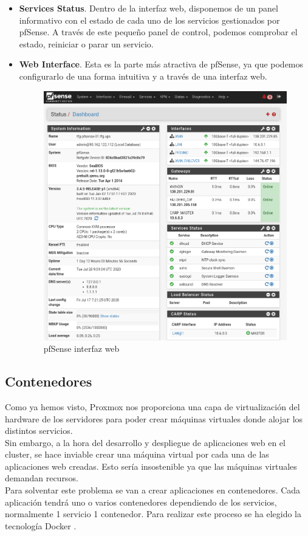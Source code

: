 \begin{paragraph}
\begin{itemize}
					\item \textbf{Services Status}. Dentro de la interfaz web, disponemos de un panel informativo con el estado de cada uno de los servicios gestionados por pfSense. A través de este pequeño panel de control, podemos comprobar el estado, reiniciar o parar un servicio.
					\item \textbf{Web Interface}. Esta es la parte más atractiva de pfSense, ya que podemos configurarlo de una forma intuitiva y a través de una interfaz web.
					\begin{figure}[!hbt]
						\centering
						\includegraphics[scale=0.3]{imagenes/Diseno/pfsense_wui.png}
						\caption[pfSense interfaz web]{pfSense interfaz web} 
						\label{pfsense_wui}
					\end{figure}
				\end{itemize}
			\end{paragraph}
		\clearpage
	\subsection{Contenedores}
		\begin{paragraph}
			Como ya hemos visto, Proxmox nos proporciona una capa de virtualización del hardware de los servidores para poder crear máquinas virtuales donde alojar los distintos servicios. \\
			Sin embargo, a la hora del desarrollo y despliegue de aplicaciones web en el cluster, se hace inviable crear una máquina virtual por cada una de las aplicaciones web creadas. Esto sería insostenible ya que las máquinas virtuales demandan recursos. \\
			
			Para solventar este problema se van a crear aplicaciones en contenedores. Cada aplicación tendrá uno o varios contenedores dependiendo de los servicios, normalmente 1 servicio 1 contenedor. Para realizar este proceso se ha elegido la tecnología Docker \cite{docker:online}.
		\end{paragraph}
